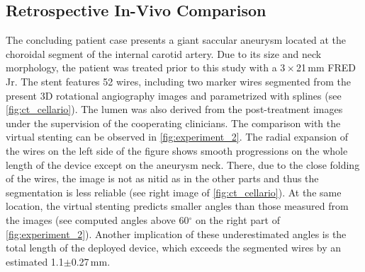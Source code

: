 \subsection{Retrospective In-Vivo Comparison}
The concluding patient case presents a giant saccular aneurysm located at the choroidal segment of the internal carotid artery. Due to its size and neck morphology, the patient was treated prior to this study with a 3\,$\times$\,21\,mm FRED Jr. The stent features 52 wires, including two marker wires segmented from the present 3D rotational angiography images and parametrized with splines (see \autoref{fig:ct_cellario}). The lumen was also derived from the post-treatment images under the supervision of the cooperating clinicians. The comparison with the virtual stenting can be observed in \autoref{fig:experiment_2}. The radial expansion of the wires on the left side of the figure shows smooth progressions on the whole length of the device except on the aneurysm neck. There, due to the close folding of the wires, the image is not as nitid as in the other parts and thus the segmentation is less reliable (see right image of \autoref{fig:ct_cellario}). At the same location, the virtual stenting predicts smaller angles than those measured from the images (see computed angles above 60$^\circ$ on the right part of \autoref{fig:experiment_2}). Another implication of these underestimated angles is the total length of the deployed device, which exceeds the segmented wires by an estimated 1.1$\pm$0.27\,mm.

